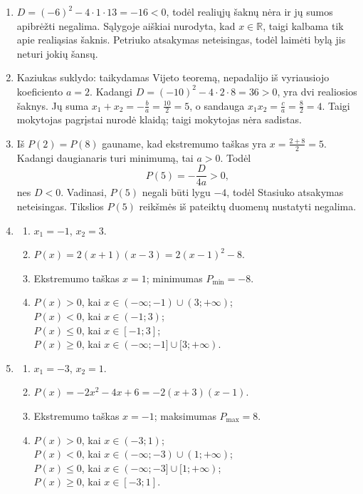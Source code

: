 \documentclass[11pt,a4paper]{article}
\begin{document}
\begin{enumerate}[label=\textbf{\arabic*.},leftmargin=2.6em,itemsep=0.85em,topsep=0.55em]

\item $D=(-6)^2-4\cdot 1\cdot13=-16<0$, todėl realiųjų šaknų nėra ir jų sumos apibrėžti negalima. Sąlygoje aiškiai nurodyta, kad $x\in\mathbb{R}$, taigi kalbama tik apie realiąsias šaknis. Petriuko atsakymas neteisingas, todėl laimėti bylą jis neturi jokių šansų.

\item Kaziukas suklydo: taikydamas Vijeto teoremą, nepadalijo iš vyriausiojo koeficiento $a=2$. Kadangi $D=(-10)^2-4\cdot2\cdot8=36>0$, yra dvi realiosios šaknys. Jų suma $x_1+x_2=-\frac{b}{a}=\frac{10}{2}=5$, o sandauga $x_1x_2=\frac{c}{a}=\frac{8}{2}=4$. Taigi mokytojas pagrįstai nurodė klaidą; taigi mokytojas nėra sadistas.

\item Iš $P(2)=P(8)$ gauname, kad ekstremumo taškas yra $x=\frac{2+8}{2}=5$. Kadangi daugianaris turi minimumą, tai $a>0$. Todėl
  \[
    P(5)=-\frac{D}{4a}>0,
  \]
  nes $D<0$. Vadinasi, $P(5)$ negali būti lygu $-4$, todėl Stasiuko atsakymas neteisingas. Tikslios $P(5)$ reikšmės iš pateiktų duomenų nustatyti negalima.

\item
\begin{enumerate}[label=\alph*),leftmargin=2em,itemsep=0.2em,topsep=0.2em]
  \item $x_1=-1$, $x_2=3$.
  \item $P(x)=2(x+1)(x-3)=2(x-1)^2-8$.
  \item Ekstremumo taškas $x=1$; minimumas $P_{\min}=-8$.
  \item $P(x)>0$, kai $x\in(-\infty;-1)\cup(3;+\infty)$;\\
        $P(x)<0$, kai $x\in(-1;3)$;\\
        $P(x)\le0$, kai $x\in[-1;3]$;\\
        $P(x)\ge0$, kai $x\in(-\infty;-1]\cup[3;+\infty)$.
\end{enumerate}

\item
\begin{enumerate}[label=\alph*),leftmargin=2em,itemsep=0.2em,topsep=0.2em]
  \item $x_1=-3$, $x_2=1$.
  \item $P(x)=-2x^2-4x+6=-2(x+3)(x-1)$.
  \item Ekstremumo taškas $x=-1$; maksimumas $P_{\max}=8$.
  \item $P(x)>0$, kai $x\in(-3;1)$;\\
        $P(x)<0$, kai $x\in(-\infty;-3)\cup(1;+\infty)$;\\
        $P(x)\le0$, kai $x\in(-\infty;-3]\cup[1;+\infty)$;\\
        $P(x)\ge0$, kai $x\in[-3;1]$.
\end{enumerate}


\end{enumerate}
\end{document}
